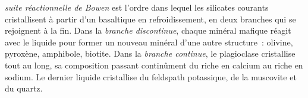 \begin{definition}\label{def:b2:magmatic-differentiation:bowen}
\emph{suite réactionnelle de Bowen} est l'ordre dans lequel
les silicates courants cristallisent à partir d'un  basaltique en refroidissement, en deux branches
qui se rejoignent à la fin. Dans la \emph{branche discontinue}, chaque minéral mafique réagit avec le
liquide pour former un nouveau minéral d'une autre structure~: olivine, pyroxène, amphibole, biotite.
Dans la \emph{branche continue}, le plagioclase cristallise tout au long,
sa composition passant continûment du riche en calcium au riche en sodium. Le dernier liquide
cristallise du feldspath potassique, de la muscovite et
du quartz.
\end{definition}

